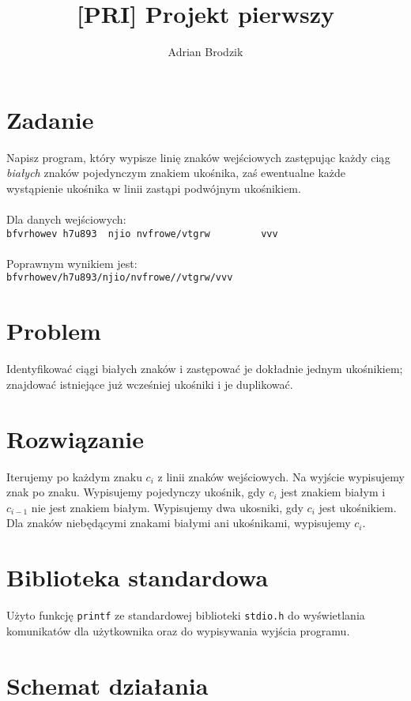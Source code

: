 \documentclass[a4paper, 12pt]{article}
\title{\bf [PRI] Projekt pierwszy}
\author{Adrian Brodzik}
\begin{document}
\maketitle

\section*{Zadanie}
Napisz program, który wypisze linię znaków wejściowych zastępując każdy ciąg \textit{białych} znaków pojedynczym znakiem ukośnika, zaś ewentualne każde wystąpienie ukośnika w linii zastąpi podwójnym ukośnikiem.
\\
\\
Dla danych wejściowych:\\
\lstinline{bfvrhowev h7u893  njio nvfrowe/vtgrw         vvv}
\\
\\
Poprawnym wynikiem jest:\\
\lstinline{bfvrhowev/h7u893/njio/nvfrowe//vtgrw/vvv}

\section*{Problem}
Identyfikować ciągi białych znaków i zastępować je dokładnie jednym ukośnikiem; znajdować istniejące już wcześniej ukośniki i je duplikować.

\section*{Rozwiązanie}
Iterujemy po każdym znaku $c_{i}$ z linii znaków wejściowych. Na wyjście wypisujemy znak po znaku. Wypisujemy pojedynczy ukośnik, gdy $c_{i}$ jest znakiem białym i $c_{i-1}$ nie jest znakiem białym. Wypisujemy dwa ukosniki, gdy $c_{i}$ jest ukośnikiem. Dla znaków niebędącymi znakami białymi ani ukośnikami, wypisujemy $c_{i}$.

\section*{Biblioteka standardowa}
Użyto funkcję \texttt{printf} ze standardowej biblioteki \texttt{stdio.h} do wyświetlania komunikatów dla użytkownika oraz do wypisywania wyjścia programu.

\section*{Schemat działania}
\begin{center}
\end{center}
\end{document}

